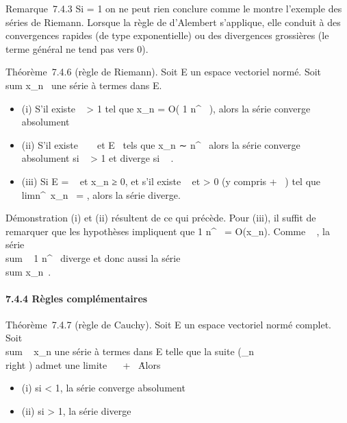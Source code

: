 \documentclass[]{article}
\begin{document}
Remarque~7.4.3 Si \ell = 1 on ne peut rien conclure comme le montre
l'exemple des séries de Riemann. Lorsque la règle de d'Alembert
s'applique, elle conduit à des convergences rapides (de type
exponentielle) ou des divergences grossières (le terme général ne tend
pas vers 0).

Théorème~7.4.6 (règle de Riemann). Soit E un espace vectoriel normé.
Soit \\sum  x_n~
une série à termes dans E.

\begin{itemize}
\itemsep1pt\parskip0pt
\item
  (i) S'il existe \alpha~ \textgreater{} 1 tel que x_n = O( 1
  \over n^\alpha~ ), alors la série converge
  absolument
\item
  (ii) S'il existe \alpha~ \in {}~ et \ell \in E \diagdown\0\
  tels que x_n ∼ \ell \over n^\alpha~
  alors la série converge absolument si \alpha~ \textgreater{} 1 et diverge si
  \alpha~ \leq 1.
\item
  (iii) Si E = ~ et x_n ≥ 0, et s'il existe \alpha~  et \ell
  \textgreater{} 0 (y compris + \infty~) tel que
  limn^\alpha~x_n~ = \ell, alors la
  série diverge.
\end{itemize}

Démonstration (i) et (ii) résultent de ce qui précède. Pour (iii), il
suffit de remarquer que les hypothèses impliquent que  1
\over n^\alpha~ = O(x_n). Comme \alpha~ , la
série \\sum ~  1
\over n^\alpha~ diverge et donc aussi la série
\\sum  x_n~.

\paragraph{7.4.4 Règles complémentaires}

Théorème~7.4.7 (règle de Cauchy). Soit E un espace vectoriel normé
complet. Soit \\sum ~
x_n une série à termes dans E telle que la suite
\left
(\rootn\of\x_n\\right
) admet une limite \ell \in {}~ \cup\ + \infty~\.
Alors

\begin{itemize}
\itemsep1pt\parskip0pt
\item
  (i) si \ell \textless{} 1, la série converge absolument
\item
  (ii) si \ell \textgreater{} 1, la série diverge
\end{itemize}
\end{document}

